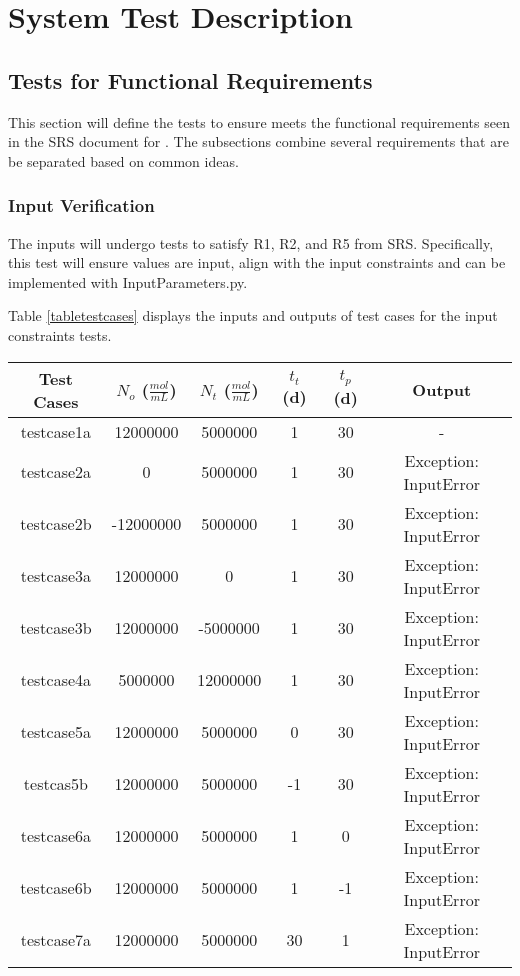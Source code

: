 \documentclass[12pt, titlepage]{article}
\begin{document}
\section{System Test Description} \label{systestcases}

\subsection{Tests for Functional Requirements} \label{tfr}

This section will define the tests to ensure \progname{} meets the functional 
requirements seen in the SRS document for \progname{} \citep{SRS}. The 
subsections combine 
several requirements that are be separated based on common ideas. 


\subsubsection{Input Verification}

The inputs will undergo tests to satisfy R1, R2, and R5 from \progname{} SRS. 
Specifically, this test will ensure values are input, align with the input constraints and can be implemented with InputParameters.py. 

Table \ref{tabletestcases} displays the inputs and outputs of test cases for the 
input constraints tests.

\begin{center}
 \begin{tabular}{|| c||c c c c|| c ||} 
 \hline
 \textbf{Test Cases} & \textbf{$N_{o}$ ($\frac{mol}{mL}$)} & \textbf{$N_{t}$ ($\frac{mol}{mL}$)} & \textbf{$t_{t}$ (d)} & \textbf{$t_{p}$ (d)} & \textbf{Output}\\ [0.5ex] 
 \hline
 testcase1a & 12000000 & 5000000 & 1 & 30 & - \\ 
 \hline
 testcase2a & 0 & 5000000 & 1 & 30 & Exception: InputError\\
 \hline
 testcase2b & -12000000 & 5000000 & 1 & 30 & Exception: InputError\\
 \hline
 testcase3a & 12000000 & 0 & 1 & 30 & Exception: InputError\\
 \hline
 testcase3b & 12000000 & -5000000 & 1 & 30 & Exception: InputError\\ 
 \hline
 testcase4a & 5000000 & 12000000 & 1 & 30 & Exception: InputError\\ 
 \hline
 testcase5a & 12000000 & 5000000 & 0 & 30 & Exception: InputError\\
 \hline
 testcas5b & 12000000 & 5000000 & -1 & 30 & Exception: InputError\\
 \hline
 testcase6a & 12000000 & 5000000 & 1 & 0 & Exception: InputError\\
 \hline
 testcase6b & 12000000 & 5000000 & 1 & -1 & Exception: InputError\\ 
 \hline
 testcase7a & 12000000 & 5000000 & 30 & 1 & Exception: InputError\\  [1ex] 
 \hline
\end{tabular}
\label{tabletestcases}

\end{center}		
\end{document}
